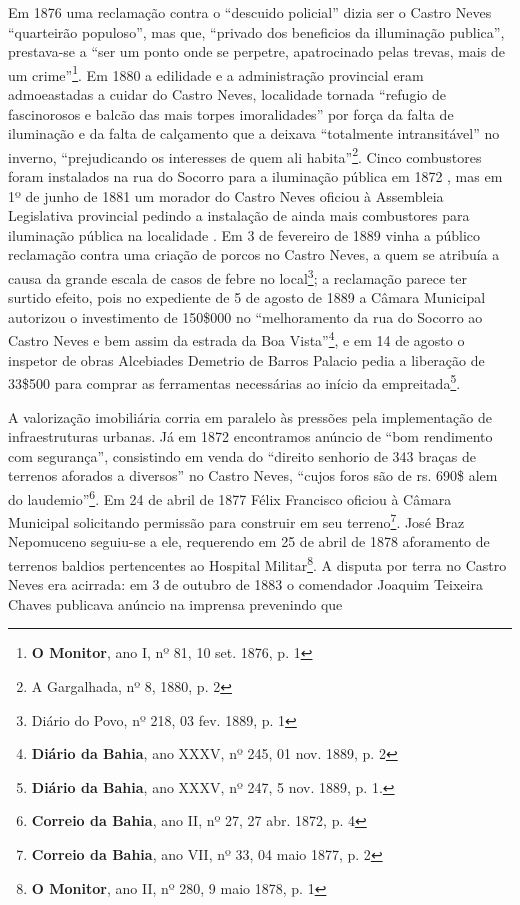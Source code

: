 Em 1876 uma reclamação contra o ``descuido policial'' dizia ser o Castro Neves ``quarteirão populoso'', mas que, ``privado dos beneficios da illuminação publica'', prestava-se a ``ser um ponto onde se perpetre, apatrocinado pelas trevas, mais de um crime''\footnote{\textbf{O Monitor}, ano I, nº 81, 10 set. 1876, p. 1}. Em 1880 a edilidade e a administração provincial eram admoeastadas a cuidar do Castro Neves, localidade tornada ``refugio de fascinorosos e balcão das mais torpes imoralidades'' por força da falta de iluminação e da falta de calçamento que a deixava ``totalmente intransitável'' no inverno, ``prejudicando os interesses de quem ali habita''\footnote{A Gargalhada, nº 8, 1880, p. 2}. Cinco combustores foram instalados na rua do Socorro para a iluminação pública em 1872 \cite[relat.~obras~públ.,~p.~38]{bahia_1872}, mas em 1º de junho de 1881 um morador do Castro Neves oficiou à Assembleia Legislativa provincial pedindo a instalação de ainda mais combustores para iluminação pública na localidade \cite[p.~3]{bahia_relatassleg_1881}. Em 3 de fevereiro de 1889 vinha a público reclamação contra uma criação de porcos no Castro Neves, a quem se atribuía a causa da grande escala de casos de febre no local\footnote{Diário do Povo, nº 218, 03 fev. 1889, p. 1}; a reclamação parece ter surtido efeito, pois no expediente de 5 de agosto de 1889 a Câmara Municipal autorizou o investimento de 150\$000 no ``melhoramento da rua do Socorro ao Castro Neves e bem assim da estrada da Boa Vista''\footnote{\textbf{Diário da Bahia}, ano XXXV, nº 245, 01 nov. 1889, p. 2}, e em 14 de agosto o inspetor de obras Alcebiades Demetrio de Barros Palacio pedia a liberação de 33\$500 para comprar as ferramentas necessárias ao início da empreitada\footnote{\textbf{Diário da Bahia}, ano XXXV, nº 247, 5 nov. 1889, p. 1.}.

A valorização imobiliária corria em paralelo às pressões pela implementação de infraestruturas urbanas. Já em 1872 encontramos anúncio de ``bom rendimento com segurança'', consistindo em venda do ``direito senhorio de 343 braças de terrenos aforados a diversos'' no Castro Neves, ``cujos foros são de rs. 690\$ alem do laudemio''\footnote{\textbf{Correio da Bahia}, ano II, nº 27, 27 abr. 1872, p. 4}. Em 24 de abril de 1877 Félix Francisco oficiou à Câmara Municipal solicitando permissão para construir em seu terreno\footnote{\textbf{Correio da Bahia}, ano VII, nº 33, 04 maio 1877, p. 2}. José Braz Nepomuceno seguiu-se a ele, requerendo em 25 de abril de 1878 aforamento de terrenos baldios pertencentes ao Hospital Militar\footnote{\textbf{O Monitor}, ano II, nº 280, 9 maio 1878, p. 1}. A disputa por terra no Castro Neves era acirrada: em 3 de outubro de 1883 o comendador Joaquim Teixeira Chaves publicava anúncio na imprensa prevenindo que 

